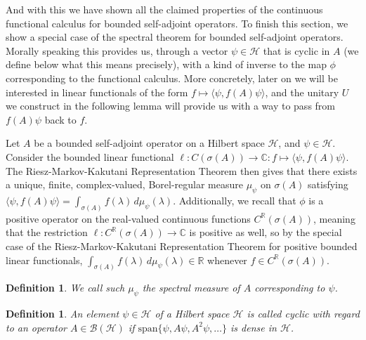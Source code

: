 \documentclass[12pt,oneside]{report}
\newtheorem{defn}[thm]{Definition}
\begin{document}
And with this we have shown all the claimed properties of the continuous functional calculus for bounded self-adjoint operators. To finish this section, we show a special case of the spectral theorem for bounded self-adjoint operators. Morally speaking this provides us, through a vector $\psi \in \mathscr{H}$ that is cyclic in $A$ (we define below what this means precisely), with a kind of inverse to the map $\phi$ corresponding to the functional calculus. More concretely, later on we will be interested in linear functionals of the form $f \mapsto \langle \psi, f(A) \psi \rangle$, and the unitary $U$ we construct in the following lemma will provide us with a way to pass from $f(A)\psi$ back to $f$.

Let $A$ be a bounded self-adjoint operator on a Hilbert space $\mathscr{H}$, and $\psi \in \mathscr{H}$. Consider the bounded linear functional $\ell: C(\sigma(A)) \to \mathbb{C}: f \mapsto \langle \psi, f(A) \psi \rangle$. The Riesz-Markov-Kakutani Representation Theorem then gives that there exists a unique, finite, complex-valued, Borel-regular measure $\mu_{\psi}$ on $\sigma(A)$ satisfying $\langle \psi, f(A)\psi \rangle = \int _{\sigma(A)} f(\lambda) \, d\mu_{\psi}(\lambda)$. Additionally, we recall that $\phi$ is a positive operator on the real-valued continuous functions $C^{\mathbb{R}}(\sigma(A))$, meaning that the restriction $\ell: C^{\mathbb{R}}(\sigma(A)) \to \mathbb{C}$ is positive as well, so by the special case of the Riesz-Markov-Kakutani Representation Theorem for positive bounded linear functionals, $\int _{\sigma(A)} f(\lambda) \, d\mu_{\psi}(\lambda) \in \mathbb{R}$ whenever $f \in C^{\mathbb{R}}(\sigma(A))$.

\begin{defn}
    We call such $\mu_{\psi}$ the spectral measure of $A$ corresponding to $\psi$.
\end{defn}

\begin{defn}
    An element $\psi \in \mathscr{H}$ of a Hilbert space $\mathscr{H}$ is called cyclic with regard to an operator $A \in \mathscr{B}(\mathscr{H})$ if $\text{span}\{ \psi, A\psi, A^{2}\psi, \dots \}$ is dense in $\mathscr{H}$.
\end{defn}
\end{document}
